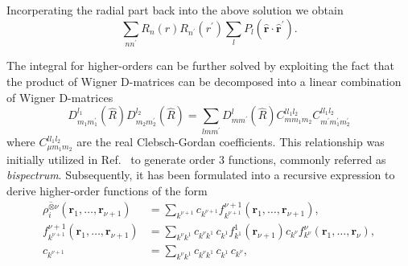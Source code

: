 Incorperating the radial part back into the above solution we obtain
\begin{equation}
  \label{eq:soap}
  \sum_{nn^\prime} R_n(r)R_{n^\prime}(r^\prime) \sum_{l} P_l(\hat{\mathbf{r}}\cdot\hat{\mathbf{r}}^\prime).
\end{equation}

The integral for higher-orders can be further solved by exploiting the fact that the product of Wigner D-matrices can be decomposed into a linear combination of Wigner D-matrices
\begin{equation}
  D^{l_1}_{m_1m_1^\prime}(\hat{R})D^{l_2}_{m_2m_2^\prime}(\hat{R}) = \sum_{l m m^\prime} D^{l}_{mm^\prime}(\hat{R}) C^{l l_1l_2}_{mm_1m_2}C^{l l_1l_2}_{m^\prime m_1^\prime m_2^\prime}
\end{equation}
where $C^{l l_1l_2}_{\mu m_1m_2}$ are the real Clebsch-Gordan coefficients\cite{yutsis1965theory,nigam2020recursive}.
This relationship was initially utilized in Ref.~\cite{bartok2013representing} to generate order 3 functions, commonly referred as \emph{bispectrum}.
Subsequently, it has been formulated into a recursive expression to derive higher-order functions of the form
\begin{subequations}
\begin{align}
  \label{eq:recursive_higherorder}
  \overline{\rho_i^{\otimes\nu}}(\mathbf{r}_1, \ldots, \mathbf{r}_{\nu+1}) &= \sum_{k^{\nu+1}} c_{k^{\nu+1}} f^{\nu+1}_{k^{\nu+1}}(\mathbf{r}_1, \ldots, \mathbf{r}_{\nu+1}), \\
  f^{\nu+1}_{k^{\nu+1}}(\mathbf{r}_1, \ldots, \mathbf{r}_{\nu+1}) &= \sum_{k^\nu k^1} c_{k^\nu k^1}\, c_{k^1} f^{1}_{k^1}(\mathbf{r}_{\nu+1}) c_{k^\nu} f^{\nu}_{k^\nu}(\mathbf{r}_1, \ldots, \mathbf{r}_{\nu}), \\
  c_{k^{\nu+1}} &= \sum_{k^\nu k^1} c_{k^\nu k^1}\, c_{k^1}\, c_{k^\nu},
\end{align}
\end{subequations}
